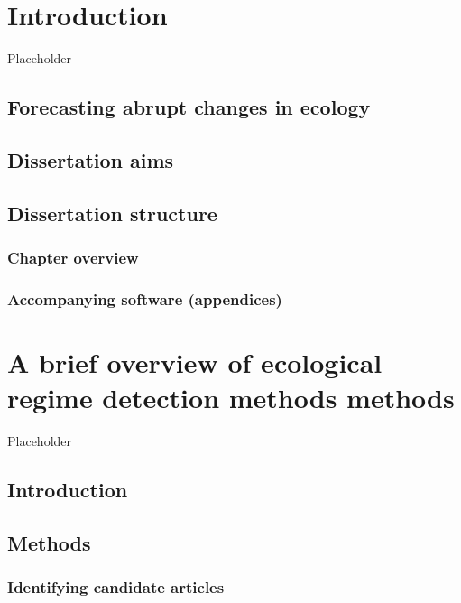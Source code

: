 \documentclass[12pt,twoside,openany]{reedthesis}
\begin{document}
\endgroup{}

\chapter{Introduction}\label{intro}

Placeholder

\section{Forecasting abrupt changes in
ecology}\label{forecasting-abrupt-changes-in-ecology}

\section{Dissertation aims}\label{dissertation-aims}

\section{Dissertation structure}\label{dissertation-structure}

\subsection{Chapter overview}\label{chapter-overview}

\subsection{Accompanying software
(appendices)}\label{accompanying-software-appendices}

\chapter{A brief overview of ecological regime detection methods
methods}\label{rdmReview}

Placeholder

\section{Introduction}\label{introduction}

\section{Methods}\label{methods}

\subsection{Identifying candidate
articles}\label{identifying-candidate-articles}
\end{document}

